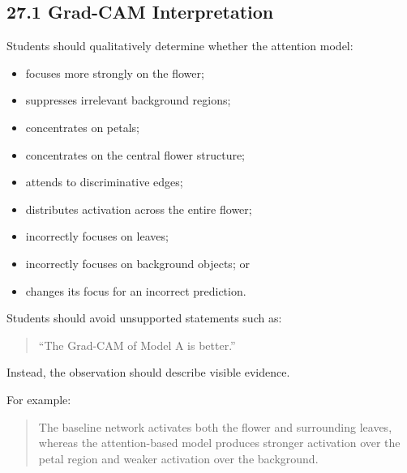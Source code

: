 \documentclass[10pt]{article}
\begin{document}
\subsection*{27.1 Grad-CAM Interpretation}

Students should qualitatively determine whether the attention model:

\begin{itemize}

\item focuses more strongly on the flower;

\item suppresses irrelevant background regions;

\item concentrates on petals;

\item concentrates on the central flower structure;

\item attends to discriminative edges;

\item distributes activation across the entire flower;

\item incorrectly focuses on leaves;

\item incorrectly focuses on background objects; or

\item changes its focus for an incorrect prediction.

\end{itemize}

Students should avoid unsupported statements such as:

\begin{quote}
``The Grad-CAM of Model A is better.''
\end{quote}

Instead, the observation should describe visible evidence.

For example:

\begin{quote}
The baseline network activates both the flower and surrounding leaves,
whereas the attention-based model produces stronger activation over the petal
region and weaker activation over the background.
\end{quote}

\end{document}
